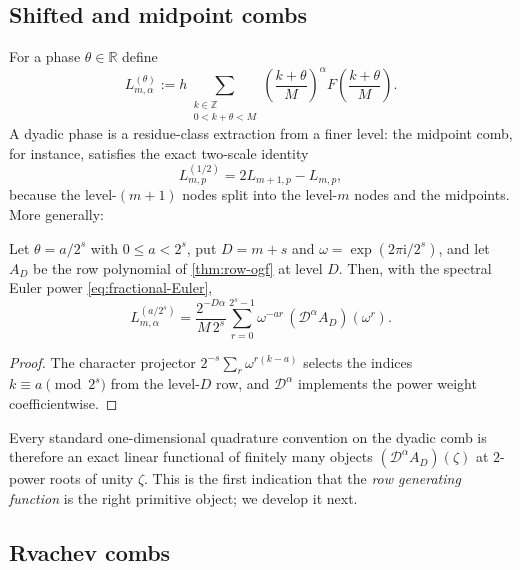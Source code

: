 \documentclass[11pt,oneside]{article}
\numberwithin{equation}{section}
\theoremstyle{definition}
\theoremstyle{remark}
\newcommand{\R}{\mathbb R}
\newcommand{\Z}{\mathbb Z}
\newcommand{\ii}{\mathrm i}
\newcommand{\Dop}{\mathcal D}
\begin{document}
\subsection{Shifted and midpoint combs}

For a phase $\theta\in\R$ define
\begin{equation}
 L_{m,\alpha}^{(\theta)}
 :=h\sum_{\substack{k\in\Z\\0<k+\theta<M}}
 \left(\frac{k+\theta}{M}\right)^{\alpha}
 F\!\left(\frac{k+\theta}{M}\right).
 \label{eq:shifted-comb}
\end{equation}
A dyadic phase is a residue-class extraction from a finer level: the
midpoint comb, for instance, satisfies the exact two-scale identity
\begin{equation}
 L^{(1/2)}_{m,p}
 =2L_{m+1,p}-L_{m,p},
 \label{eq:midpoint}
\end{equation}
because the level-$(m{+}1)$ nodes split into the level-$m$ nodes and
the midpoints.  More generally:

\begin{proposition}
\label{prop:roots-of-unity}
Let $\theta=a/2^{s}$ with $0\le a<2^{s}$, put $D=m+s$ and
$\omega=\exp(2\pi\ii/2^{s})$, and let $A_D$ be the row polynomial of
\cref{thm:row-ogf} at level $D$.  Then, with the spectral Euler power
\eqref{eq:fractional-Euler},
\begin{equation}
 L_{m,\alpha}^{(a/2^{s})}
 =\frac{2^{-D\alpha}}{M\,2^{s}}
 \sum_{r=0}^{2^{s}-1}\omega^{-ar}\,
 (\Dop^{\alpha}A_D)(\omega^{r}).
 \label{eq:root-filter}
\end{equation}
\end{proposition}

\begin{proof}
The character projector $2^{-s}\sum_r\omega^{r(k-a)}$ selects the
indices $k\equiv a\pmod{2^{s}}$ from the level-$D$ row, and
$\Dop^\alpha$ implements the power weight coefficientwise.
\end{proof}

Every standard one-dimensional quadrature convention on the dyadic comb
is therefore an exact linear functional of finitely many objects
$(\Dop^{\alpha}A_D)(\zeta)$ at $2$-power roots of unity $\zeta$.  This
is the first indication that the \emph{row generating function} is the
right primitive object; we develop it next.

\subsection{Rvachev combs}
\end{document}
